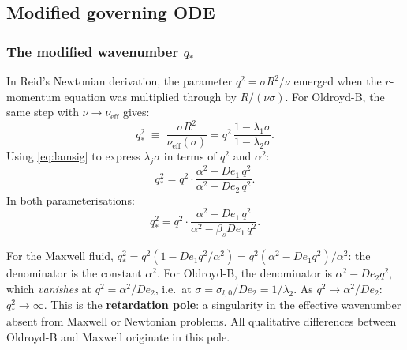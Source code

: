 \subsection{Modified governing ODE}

\subsubsection{The modified wavenumber $q_*$}

\begin{derivbox}
In Reid's Newtonian derivation, the parameter $q^2 = \sigma R^2/\nu$ emerged
when the $r$-momentum equation was multiplied through by $R/(\nu\sigma)$.
For Oldroyd-B, the same step with $\nu \to \nu_{\mathrm{eff}}$ gives:
\begin{equation}
  q_*^2 \;\equiv\; \frac{\sigma R^2}{\nu_{\mathrm{eff}}(\sigma)}
  = q^2\,\frac{1-\lambda_1\sigma}{1-\lambda_2\sigma}.
  \label{eq:qstar_raw}
\end{equation}
Using \eqref{eq:lamsig} to express $\lambda_j\sigma$ in terms of $q^2$
and $\alpha^2$:
\begin{equation}
  \boxed{
    q_*^2 = q^2\cdot\frac{\alpha^2 - De_1\,q^2}{\alpha^2 - De_2\,q^2}.
  }
  \label{eq:qstar_OB}
\end{equation}
In both parameterisations:
\begin{equation}
  q_*^2 = q^2\cdot\frac{\alpha^2 - De_1\,q^2}{\alpha^2 - \beta_s De_1\,q^2}.
  \label{eq:qstar_both}
\end{equation}
\end{derivbox}

\begin{notebox}
For the Maxwell fluid, $q_*^2 = q^2(1 - De_1 q^2/\alpha^2) =
q^2(\alpha^2 - De_1 q^2)/\alpha^2$: the denominator is the constant
$\alpha^2$. For Oldroyd-B, the denominator is $\alpha^2 - De_2 q^2$,
which \emph{vanishes} at $q^2 = \alpha^2/De_2$, i.e.\ at
$\sigma = \sigma_{l;0}/De_2 = 1/\lambda_2$. As $q^2 \to \alpha^2/De_2$:
$q_*^2 \to \infty$. This is the \textbf{retardation pole}: a singularity
in the effective wavenumber absent from Maxwell or Newtonian problems. All qualitative differences between Oldroyd-B and Maxwell originate in this pole.
\end{notebox}

